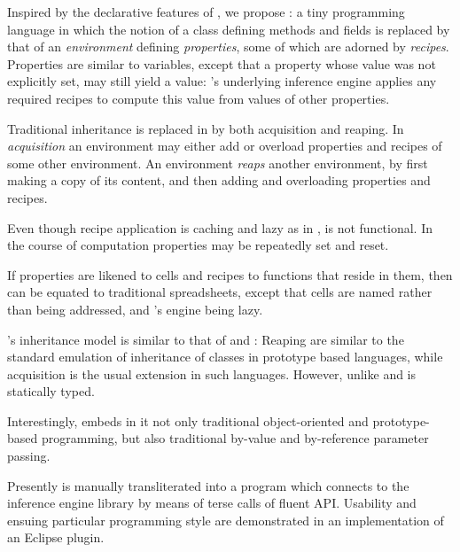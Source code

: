 Inspired by the declarative features of , we propose \Reap: a tiny
programming language in which the notion of a class defining methods and fields
is replaced by that of an \emph{environment} defining \emph{properties}, some
of which are adorned by \emph{recipes}.  Properties are similar to variables,
   except that a property whose value was not explicitly set, may still yield a
   value: \Reap's underlying inference engine applies any required recipes to
   compute this value from values of other properties. 

Traditional inheritance is replaced in \Reap by both acquisition and reaping.
In \emph{acquisition} an environment may either add or overload properties and
recipes of some other environment. An environment \emph{reaps} another
environment, by first making a copy of its content, and then adding and
overloading properties and recipes. 

Even though recipe application is caching and lazy as in
, \Reap is not functional. In the course of
computation properties may be repeatedly set and reset.

If properties are likened to cells and recipes to functions that reside in them,
then \Reap can be equated to traditional spreadsheets, except that cells
   are named rather than being addressed, and \Reap's engine being lazy. 
   
\Reap's inheritance model is similar to that of  and
: Reaping are similar to the standard emulation of
inheritance of classes in prototype based languages, while acquisition is the
usual extension in such languages.  However, unlike  and
 \Reap is statically typed.

Interestingly, \Reap embeds in it not only traditional object-oriented and
prototype-based programming, but also traditional by-value and by-reference
parameter passing.  

Presently \Reap is manually transliterated into a  program
which connects to the inference engine library by means of terse calls of
fluent API. Usability and ensuing particular programming style are demonstrated
in an implementation of an Eclipse plugin. 
